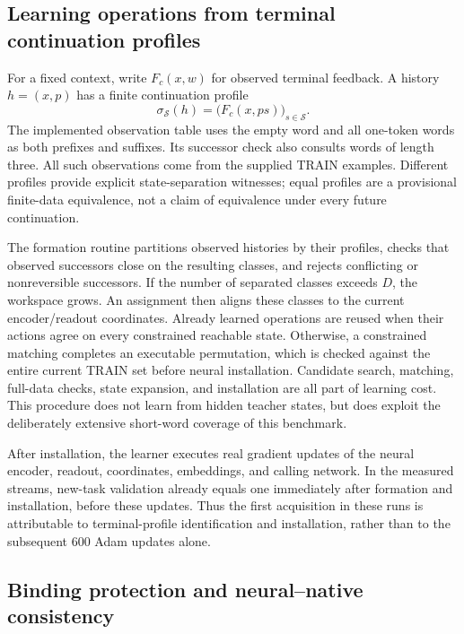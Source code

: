 \subsection{Learning operations from terminal continuation profiles}

For a fixed context, write $F_c(x,w)$ for observed terminal feedback. A history
$h=(x,p)$ has a finite continuation profile
\begin{equation}
 \sigma_{\mathcal S}(h)=\big(F_c(x,ps)\big)_{s\in\mathcal S}.
 \label{eq:terminal-profile}
\end{equation}
The implemented observation table uses the empty word and all one-token words
as both prefixes and suffixes. Its successor check also consults words of
length three. All such observations come from the supplied TRAIN examples.
Different profiles provide explicit state-separation witnesses; equal profiles
are a provisional finite-data equivalence, not a claim of equivalence under
every future continuation.

The formation routine partitions observed histories by their profiles, checks
that observed successors close on the resulting classes, and rejects conflicting
or nonreversible successors. If the number of separated classes exceeds $D$,
the workspace grows. An assignment then aligns these classes to the current
encoder/readout coordinates. Already learned operations are reused when their
actions agree on every constrained reachable state. Otherwise, a constrained
matching completes an executable permutation, which is checked against the
entire current TRAIN set before neural installation. Candidate search,
matching, full-data checks, state expansion, and installation are all part of
learning cost. This procedure does not learn from hidden teacher states, but
does exploit the deliberately extensive short-word coverage of this benchmark.

After installation, the learner executes real gradient updates of the neural
encoder, readout, coordinates, embeddings, and calling network. In the measured
streams, new-task validation already equals one immediately after formation and
installation, before these updates. Thus the first acquisition in these runs is
attributable to terminal-profile identification and installation, rather than
to the subsequent 600 Adam updates alone.

\subsection{Binding protection and neural--native consistency}

